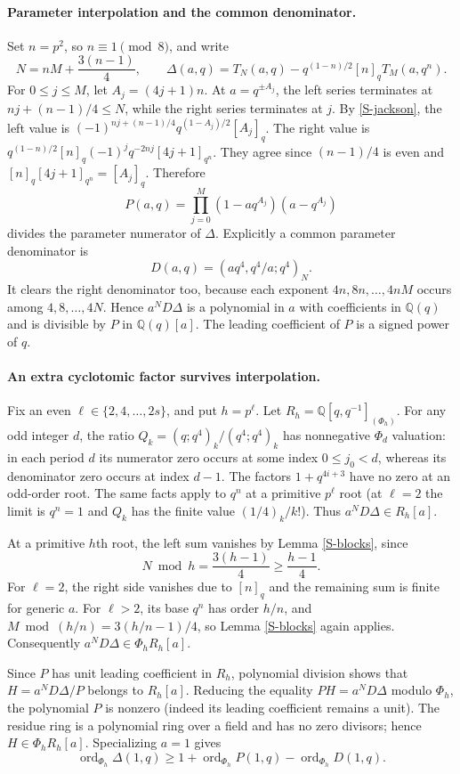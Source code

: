 \documentclass[11pt,letterpaper]{article}
\numberwithin{equation}{section}
\newcommand{\vp}{\operatorname{ord}}
\begin{document}
\paragraph{Parameter interpolation and the common denominator.}
Set $n=p^2$, so $n\equiv1\pmod8$, and write
\[
 N=nM+\frac{3(n-1)}4,\qquad
 \Delta(a,q)=T_N(a,q)-q^{(1-n)/2}[n]_qT_M(a,q^n).
\]
For $0\le j\le M$, let $A_j=(4j+1)n$.
At $a=q^{\pm A_j}$, the left series terminates at
$nj+(n-1)/4\le N$, while the right series terminates at $j$.
By \eqref{S-jackson}, the left value is
$(-1)^{nj+(n-1)/4}q^{(1-A_j)/2}[A_j]_q$.
The right value is
$q^{(1-n)/2}[n]_q(-1)^j q^{-2nj}[4j+1]_{q^n}$.
They agree since $(n-1)/4$ is even and
$[n]_q[4j+1]_{q^n}=[A_j]_q$. Therefore
\[
 P(a,q)=\prod_{j=0}^{M}(1-aq^{A_j})(a-q^{A_j})
\]
divides the parameter numerator of $\Delta$.
Explicitly a common parameter denominator is
\[
 D(a,q)=(aq^4,q^4/a;q^4)_N.
\]
It clears the right denominator too, because each exponent
$4n,8n,\ldots,4nM$ occurs among $4,8,\ldots,4N$.
Hence $a^ND\Delta$ is a polynomial in $a$ with coefficients in
$\mathbb Q(q)$ and is divisible by $P$ in $\mathbb Q(q)[a]$.
The leading coefficient of $P$ is a signed power of $q$.

\paragraph{An extra cyclotomic factor survives interpolation.}
Fix an even $\ell\in\{2,4,\ldots,2s\}$, and put $h=p^\ell$.
Let $R_h=\mathbb Q[q,q^{-1}]_{(\Phi_h)}$.
For any odd integer $d$, the ratio $Q_k=(q;q^4)_k/(q^4;q^4)_k$
has nonnegative $\Phi_d$ valuation: in each period $d$ its numerator
zero occurs at some index $0\le j_0<d$, whereas its denominator zero
occurs at index $d-1$. The factors $1+q^{4i+3}$ have no zero at an
odd-order root. The same facts apply to $q^n$ at a primitive
$p^\ell$ root (at $\ell=2$ the limit is $q^n=1$ and $Q_k$ has the
finite value $(1/4)_k/k!$). Thus
$a^ND\Delta\in R_h[a]$.

At a primitive $h$th root, the left sum vanishes by Lemma
\ref{S-blocks}, since
\[
 N\bmod h=\frac{3(h-1)}4\ge\frac{h-1}4.
\]
For $\ell=2$, the right side vanishes due to $[n]_q$ and the remaining
sum is finite for generic $a$. For $\ell>2$, its base $q^n$ has order
$h/n$, and
$M\bmod(h/n)=3(h/n-1)/4$, so Lemma \ref{S-blocks} again applies.
Consequently $a^ND\Delta\in\Phi_hR_h[a]$.

Since $P$ has unit leading coefficient in $R_h$, polynomial division
shows that $H=a^ND\Delta/P$ belongs to $R_h[a]$. Reducing the equality
$PH=a^ND\Delta$ modulo $\Phi_h$, the polynomial $P$ is nonzero
(indeed its leading coefficient remains a unit). The residue ring
is a polynomial ring over a field and has no zero divisors; hence
$H\in\Phi_hR_h[a]$. Specializing $a=1$ gives
\begin{equation}\label{S-multiplicity}
 \vp_{\Phi_h}\Delta(1,q)\ge1+
 \vp_{\Phi_h}P(1,q)-\vp_{\Phi_h}D(1,q).
\end{equation}
\end{document}
